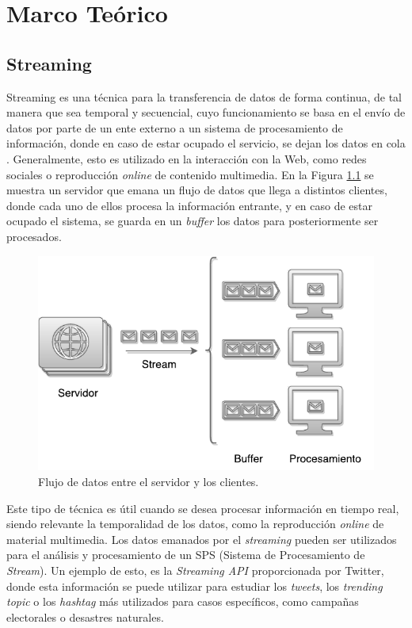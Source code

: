 \chapter{Marco Teórico}
\label{cap:marcoTeorico}

\section{Streaming}
\label{sec:streaming}

Streaming es una técnica para la transferencia de datos de forma continua, de tal manera que sea temporal y secuencial, cuyo funcionamiento se basa en el envío de datos por parte de un ente externo a un sistema de procesamiento de información, donde en caso de estar ocupado el servicio, se dejan los datos en cola \citep{Menin2002SMH}. Generalmente, esto es utilizado en la interacción con la Web, como redes sociales o reproducción \textit{online} de contenido multimedia. En la Figura \ref{fig:streaming} se muestra un servidor que emana un flujo de datos que llega a distintos clientes, donde cada uno de ellos procesa la información entrante, y en caso de estar ocupado el sistema, se guarda en un \textit{buffer} los datos para posteriormente ser procesados.

\begin{figure}[ht!]
  \centering
    \includegraphics[scale=0.7]{images/Streaming.pdf}
  \caption{Flujo de datos entre el servidor y los clientes.}
  \label{fig:streaming}
\end{figure}

Este tipo de técnica es útil cuando se desea procesar información en tiempo real, siendo relevante la temporalidad de los datos, como la reproducción \textit{online} de material multimedia. Los datos emanados por el \textit{streaming} pueden ser utilizados para el análisis y procesamiento de un SPS (Sistema de Procesamiento de \textit{Stream}). Un ejemplo de esto, es la \textit{Streaming API} proporcionada por Twitter, donde esta información se puede utilizar para estudiar los \textit{tweets}, los \textit{trending topic} o los \textit{hashtag} más utilizados para casos específicos, como campañas electorales o desastres naturales.

